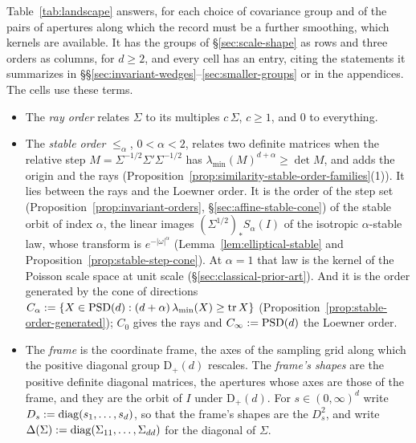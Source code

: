 Table~\ref{tab:landscape} answers, for each choice of covariance group and of the pairs of apertures
along which the record must be a further smoothing, which kernels are available. It has the groups of \S\ref{sec:scale-shape}
as rows and three orders as columns, for $d \ge 2$, and every cell has an entry, citing the statements
it summarizes in \S\S\ref{sec:invariant-wedges}--\ref{sec:smaller-groups} or in the appendices. The
cells use these terms.
\begin{itemize}
\item The \emph{ray order} relates $\Sigma$ to its multiples $c\,\Sigma$, $c \ge 1$, and $0$ to
everything.
\item The \emph{stable order} $\le_\alpha$, $0 < \alpha < 2$, relates two definite matrices when the
relative step $M = \Sigma^{-1/2}\Sigma'\Sigma^{-1/2}$ has $\lambda_{\min}(M)^{d+\alpha} \ge \det M$, and
adds the origin and the rays (Proposition~\ref{prop:similarity-stable-order-families}(1)). It lies
between the rays and the Loewner order.
It is the order of the step set (Proposition~\ref{prop:invariant-orders}, \S\ref{sec:affine-stable-cone})
of the stable orbit of index $\alpha$, the linear images $(\Sigma^{1/2})_*S_\alpha(I)$ of the isotropic $\alpha$-stable law, whose
transform is $e^{-|\omega|^\alpha}$ (Lemma~\ref{lem:elliptical-stable} and
Proposition~\ref{prop:stable-step-cone}). At $\alpha = 1$ that law is the kernel of the Poisson scale
space at unit scale (\S\ref{sec:classical-prior-art}). And it is the order generated by the cone of directions
$C_\alpha := \{X \in \mathrm{PSD}(d) : (d+\alpha)\,\lambda_{\min}(X) \ge \operatorname{tr} X\}$
(Proposition~\ref{prop:stable-order-generated}); $C_0$ gives the rays and $C_\infty := \mathrm{PSD}(d)$ the
Loewner order.
\item The \emph{frame} is the coordinate frame, the axes of the sampling grid along which the
positive diagonal group $\mathrm D_+(d)$ rescales. The \emph{frame's shapes} are the positive definite
diagonal matrices, the apertures whose axes are those of the frame, and they are the orbit of $I$
under $\mathrm D_+(d)$.
For $s \in (0,\infty)^d$ write $D_s := \operatorname{diag}(s_1,\dots,s_d)$, so that the frame's shapes are the
$D_s^2$, and write $\Delta(\Sigma) := \operatorname{diag}(\Sigma_{11},\dots,\Sigma_{dd})$ for the diagonal of $\Sigma$.

\end{itemize}
